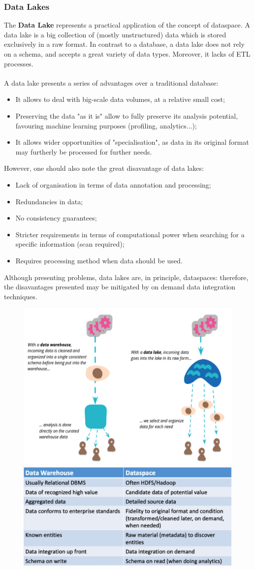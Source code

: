 \documentclass[10pt,a4paper]{article}
\newcommand{\nline}{\\~\\}
\begin{document}
\begin{justify}
\subsubsection{Data Lakes}
The \textbf{Data Lake} represents a practical application of the concept of dataspace. A data lake is a big collection of (mostly unstructured) data which is stored exclusively in a raw format. In contrast to a database, a data lake does not rely on a schema, and accepts a great variety of data types. Moreover, it lacks of ETL processes.\nline
A data lake presents a series of advantages over a traditional database:
\begin{itemize}
    \item It allows to deal with big-scale data volumes, at a relative small cost;
    \item Preserving the data "as it is" allow to fully preserve its analysis potential, favouring machine learning purposes (profiling, analytics...);
    \item It allows wider opportunities of "specialisation", as data in its original format may furtherly be processed for further needs.
\end{itemize}
However, one should also note the great disavantage of data lakes:
\begin{itemize}
    \item Lack of organisation in terms of data annotation and processing;
    \item Redundancies in data;
    \item No consistency guarantees;
    \item Stricter requirements in terms of computational power when searching for a specific information (scan required);
    \item Requires processing method when data should be used.
\end{itemize}
Although presenting problems, data lakes are, in principle, dataspaces: therefore, the disavantages presented may be mitigated by on demand data integration techniques.
\begin{figure}[htp]
\centering
\includegraphics[width=.5\textwidth]{images/data-spaces}\hfill
\includegraphics[width=.5\textwidth]{images/data-spaces-vs-dw}\hfill
\end{figure}
\pagebreak

\end{justify}
\end{document}

